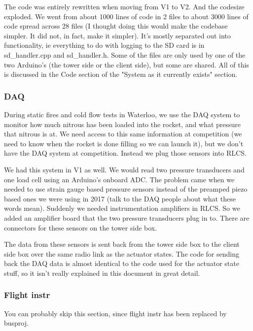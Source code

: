 \documentclass[11pt]{article}
\begin{document}
The code was entirely rewritten when moving from V1 to V2. And the codesize
exploded. We went from about 1000 lines of code in 2 files to about 3000 lines
of code spread across 28 files (I thought doing this would make the codebase
simpler. It did not, in fact, make it simpler). It's mostly separated out into
functionality, ie everything to do with logging to the SD card is in
sd\_handler.cpp and sd\_handler.h. Some of the files are only used by one of the
two Arduino's (the tower side or the client side), but some are shared. All of
this is discussed in the Code section of the "System as it currently exists"
section.

\subsubsection{DAQ}
\label{sec:orgdfd014e}

During static fires and cold flow tests in Waterloo, we use the DAQ system to
monitor how much nitrous has been loaded into the rocket, and what pressure that
nitrous is at. We need access to this same information at competition (we need
to know when the rocket is done filling so we can launch it), but we don't have
the DAQ system at competition. Instead we plug those sensors into RLCS.

We had this system in V1 as well. We would read two pressure transducers and one
load cell using an Arduino's onboard ADC. The problem came when we needed to use
strain gauge based pressure sensors instead of the preamped piezo based ones we
were using in 2017 (talk to the DAQ people about what these words
mean). Suddenly we needed instrumentation amplifiers in RLCS. So we added an
amplifier board that the two pressure transducers plug in to. There are
connectors for these sensors on the tower side box.

The data from these sensors is sent back from the tower side box to the client
side box over the same radio link as the actuator states. The code for sending
back the DAQ data is almost identical to the code used for the actuator state
stuff, so it isn't really explained in this document in great detail.

\subsubsection{Flight instr}
\label{sec:org429993c}

You can probably skip this section, since flight instr has been replaced by
busproj.
\end{document}
